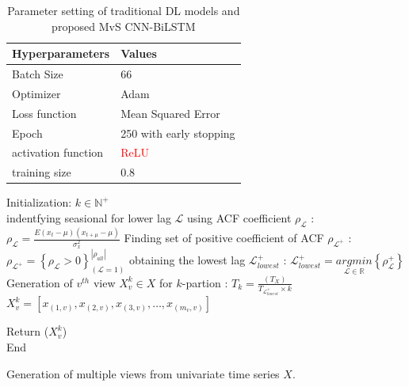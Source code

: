 \documentclass[a4paper, fleqn]{cas-sc}
\theoremstyle{definition}
\theoremstyle{remark}
\begin{document}
\begin{table}[h!]
  \caption{Parameter setting of traditional DL models and proposed MvS CNN-BiLSTM }
  \label{tab: my-table}
  \begin{tabular}{ll}
  \hline Hyperparameters & Values        \\ \hline
  Batch Size               & 66                     \\
  Optimizer                 & Adam                   \\
  Loss function            & Mean Squared Error      \\
  Epoch                    & 250 with early stopping \\
  activation function      & \textcolor{red}{ReLU}                   \\
  training size             & 0.8                   \\ \hline
  \end{tabular}
  \end{table}


\newcommand\mycommfont[1]{\footnotesize\ttfamily\textcolor{blue}{#1}}

\begin{algorithm}[!ht]
  \DontPrintSemicolon
  
    
  Initialization:  $k \in \mathbb{N}^+$\\ 
  indentfying seasional for lower lag $\mathscr{L}$ using ACF coefficient $\rho_{\mathscr{L}}$ :  
  $\rho_{\mathscr{L}}=\frac{E (x_t-\mu) (x_{t+\mu} -\mu)}{\sigma_x^2}$ 
  Finding set of positive coefficient of ACF $\rho_{\mathscr{L}^+}$ :  
  $\rho_{\mathscr{L}^+}= \left\{\rho_{\mathscr{L}} > 0 \right\}_{(\mathscr{L}=1)}^{ \left| \rho_{all} \right|}$ 
  obtaining the lowest lag $\mathscr{L}_{lowest}^+$ :  
  $ \mathscr{L}_{lowest}^+ = \underset{\mathscr{L} \in \mathbb{R}}{arg min} \left\{\rho_{\mathscr{L}}^+  \right\}$ 
  Generation of $v^{th}$ view $X_v^k \in X$ for $k$-partion :  
  $T_k=\frac{(T_X)}{T_{ \mathscr{L}_{lowest}^+ }\times k}$ 
  $X_v^k = [x_{(1, v)}, x_{(2, v)}, x_{(3, v)},  \dots , x_{(m_v, v)}]$

  Return ($X_v^k$)\\
  End
  \caption{Generation of multiple views from univariate time series $X$.}\label{alg1}
  \end{algorithm}
  
\end{document}
